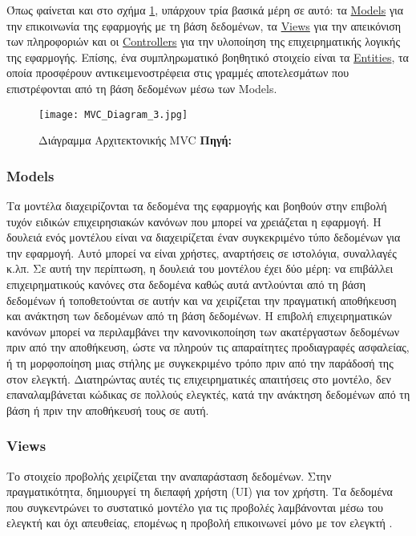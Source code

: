 Όπως φαίνεται και στο σχήμα \ref{fig:mvc-arch}, υπάρχουν τρία βασικά μέρη σε αυτό: τα \hyperref[thb:Models]{Models} για την επικοινωνία της εφαρμογής με τη βάση δεδομένων, τα \hyperref[thb:Views]{Views} για την απεικόνιση των πληροφοριών και οι \hyperref[thb:Controllers]{Controllers} για την υλοποίηση της επιχειρηματικής λογικής της εφαρμογής. Επίσης, ένα συμπληρωματικό βοηθητικό στοιχείο είναι τα \hyperref[thb:Entities]{Entities}, τα οποία προσφέρουν αντικειμενοστρέφεια στις γραμμές αποτελεσμάτων που επιστρέφονται από τη βάση δεδομένων μέσω των Models.

\begin{figure}[h]
	\centering
	\texttt{[image: MVC\_Diagram\_3.jpg]}
	\caption[{Διάγραμμα Αρχιτεκτονικής MVC}]{Διάγραμμα Αρχιτεκτονικής MVC \textbf{Πηγή:} \cite{fig_MVC_Diagram_3}}
	\label{fig:mvc-arch}
\end{figure}

\subsubsection{Models} \label{thb:Models}
Τα μοντέλα διαχειρίζονται τα δεδομένα της εφαρμογής και βοηθούν στην επιβολή τυχόν ειδικών επιχειρησιακών κανόνων που μπορεί να χρειάζεται η εφαρμογή. Η δουλειά ενός μοντέλου είναι να διαχειρίζεται έναν συγκεκριμένο τύπο δεδομένων για την εφαρμογή. Αυτό μπορεί να είναι χρήστες, αναρτήσεις σε ιστολόγια, συναλλαγές κ.λπ. Σε αυτή την περίπτωση, η δουλειά του μοντέλου έχει δύο μέρη: να επιβάλλει επιχειρηματικούς κανόνες στα δεδομένα καθώς αυτά αντλούνται από τη βάση δεδομένων ή τοποθετούνται σε αυτήν και να χειρίζεται την πραγματική αποθήκευση και ανάκτηση των δεδομένων από τη βάση δεδομένων. Η επιβολή επιχειρηματικών κανόνων μπορεί να περιλαμβάνει την κανονικοποίηση των ακατέργαστων δεδομένων πριν από την αποθήκευση, ώστε να πληρούν τις απαραίτητες προδιαγραφές ασφαλείας, ή τη μορφοποίηση μιας στήλης με συγκεκριμένο τρόπο πριν από την παράδοσή της στον ελεγκτή. Διατηρώντας αυτές τις επιχειρηματικές απαιτήσεις στο μοντέλο, δεν επαναλαμβάνεται κώδικας σε πολλούς ελεγκτές, κατά την ανάκτηση δεδομένων από τη βάση ή πριν την αποθήκευσή τους σε αυτή.

\subsubsection{Views} \label{thb:Views}
Το στοιχείο προβολής χειρίζεται την αναπαράσταση δεδομένων. Στην πραγματικότητα, δημιουργεί τη διεπαφή χρήστη (UI) για τον χρήστη. Τα δεδομένα που συγκεντρώνει το συστατικό μοντέλο για τις προβολές λαμβάνονται μέσω του ελεγκτή και όχι απευθείας, επομένως η προβολή επικοινωνεί μόνο με τον ελεγκτή \cite{tutorials_2022}.

